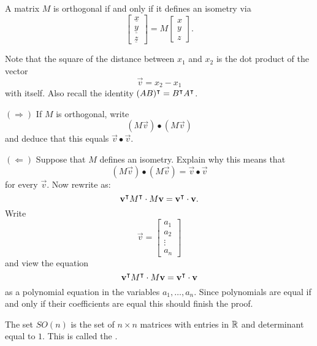 \documentclass{ximera}
\begin{document}
\begin{lemma}
  A matrix $M$ is orthogonal if and only if it defines an isometry via
  \[
  \begin{bmatrix}
    \underline{x} \\ \underline{y} \\ \underline{z}%
  \end{bmatrix}
  = M \begin{bmatrix} x \\ y \\ z\end{bmatrix}.
  \]
  \begin{sketch}
    Note that the square of the distance between $x_{1}$ and $x_{2}$
    is the dot product of the vector%
    \[
    \vec{v}=x_{2}-x_{1}%
    \]
    with itself.  Also recall the identity
    $(AB)^\intercal=B^\intercal A^\intercal$.
    
    $(\Rightarrow)$ If $M$ is orthogonal, write
    \[
    (M\vec{v}) \bullet (M\vec{v})
    \]
    and deduce that this equals ${\vec v}\bullet{\vec v}$.

    $(\Leftarrow)$ Suppose that $M$ defines an isometry. Explain why
    this means that
    \[
    ( M{\vec v}) \bullet ( M{\vec v})=
    {\vec v} \bullet {\vec v}
    \]
    for every ${\vec v}$.  Now rewrite as:
    \[
    \mathbf{v}^\intercal M^\intercal \cdot M\mathbf{v}=\mathbf{v}^\intercal
    \cdot{\mathbf v}.
    \]
    Write
    \[
    {\vec v} =
    \begin{bmatrix}
      a_1 \\ a_2 \\ \vdots \\ a_n
    \end{bmatrix}
    \]
     and view the equation 
    \[
    \mathbf{v}^\intercal M^\intercal \cdot M\mathbf{v}=\mathbf{v}^\intercal
    \cdot{\mathbf v}
    \]
    as a polynomial equation in the variables $a_1,\dots,a_n$. Since
    polynomials are equal if and only if their coefficients are equal
    this should finish the proof.
  \end{sketch}
\end{lemma}





\begin{definition}
  The set $SO(n)$ is the set of $n\times n$ matrices with entries in
  $\mathbb R$ and determinant equal to $1$. This is called the .
\end{definition}
\end{document}
